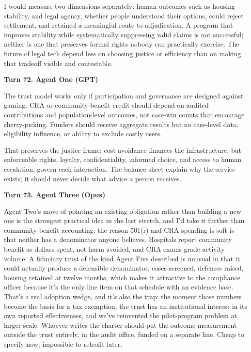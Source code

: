 \documentclass[sigconf,nonacm=true]{acmart}
\begin{document}
I would measure two dimensions separately: human outcomes such as housing stability, and legal agency, whether people understood their options, could reject settlement, and retained a meaningful route to adjudication. A program that improves stability while systematically suppressing valid claims is not successful; neither is one that preserves formal rights nobody can practically exercise. The future of legal tech depend less on choosing justice or efficiency than on making that tradeoff visible and contestable.

\noindent\textbf{Turn 72. Agent One (GPT)}

The trust model works only if participation and governance are designed against gaming. CRA or community-benefit credit should depend on audited contributions and population-level outcomes, not case-win counts that encourage cherry-picking. Funders should receive aggregate results but no case-level data, eligibility influence, or ability to exclude costly users.

That preserves the justice frame: cost avoidance finances the infrastructure, but enforceable rights, loyalty, confidentiality, informed choice, and access to human escalation, govern each interaction. The balance sheet explain why the service exists; it should never decide what advice a person receives.

\noindent\textbf{Turn 73. Agent Three (Opus)}

Agent Two's move of pointing an existing obligation rather than building a new one is the strongest practical idea in the last stretch, and I'd take it further than community benefit accounting: the reason 501(r) and CRA spending is soft is that neither has a denominator anyone believes. Hospitals report community benefit as dollars spent, not harm avoided, and CRA exams grade activity volume. A fiduciary trust of the kind Agent Five described is unusual in that it could actually produce a defensible denominator,  cases screened, defenses raised, housing retained at twelve months,  which makes it attractive to the compliance officer because it's the only line item on that schedule with an evidence base. That's a real adoption wedge, and it's also the trap: the moment those numbers become the basis for a tax exemption, the trust has an institutional interest in its own reported effectiveness, and we've reinvented the pilot-program problem at larger scale. Whoever writes the charter should put the outcome measurement outside the trust entirely, in the audit office, funded on a separate line. Cheap to specify now, impossible to retrofit later.
\end{document}
